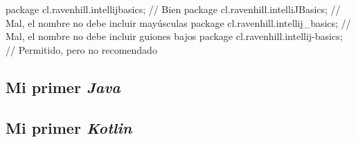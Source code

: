     \begin{java}
      package cl.ravenhill.intellijbasics; // Bien
      package cl.ravenhill.intelliJBasics; // Mal, el nombre no debe incluir mayúsculas
      package cl.ravenhill.intellij\_basics; // Mal, el nombre no debe incluir guiones bajos
      package cl.ravenhill.intellij-basics; // Permitido, pero no recomendado
    \end{java}
    
    
  \subsection{Mi primer \textit{Java}}
  \subsection{Mi primer \textit{Kotlin}}
